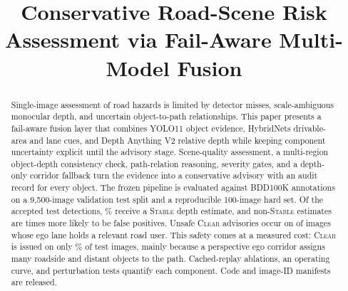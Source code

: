 \documentclass[conference,a4paper]{IEEEtran}
\newcommand{\st}[1]{\textsc{#1}}
\begin{document}
\title{Conservative Road-Scene Risk Assessment via Fail-Aware Multi-Model Fusion}

\author{
\and
{}
\and
{}
\and
{}
}

\maketitle

\begin{abstract}
Single-image assessment of road hazards is limited by detector misses, scale-ambiguous monocular depth, and uncertain object-to-path relationships. This paper presents a fail-aware fusion layer that combines YOLO11 object evidence, HybridNets drivable-area and lane cues, and Depth Anything V2 relative depth while keeping component uncertainty explicit until the advisory stage. Scene-quality assessment, a multi-region object-depth consistency check, path-relation reasoning, severity gates, and a depth-only corridor fallback turn the evidence into a conservative advisory with an audit record for every object. The frozen pipeline is evaluated against BDD100K annotations on a 9{,}500-image validation test split and a reproducible 100-image hard set. Of the accepted test detections, \TestStablePct\% receive a \st{Stable} depth estimate, and non-\st{Stable} estimates are \TestFPRatio{} times more likely to be false positives. Unsafe \st{Clear} advisories occur on \TestUnsafe{} of \TestOccupied{} images whose ego lane holds a relevant road user. This safety comes at a measured cost: \st{Clear} is issued on only \TestClearPct\% of test images, mainly because a perspective ego corridor assigns many roadside and distant objects to the path. Cached-replay ablations, an operating curve, and perturbation tests quantify each component. Code and image-ID manifests are released.
\end{abstract}
\end{document}
